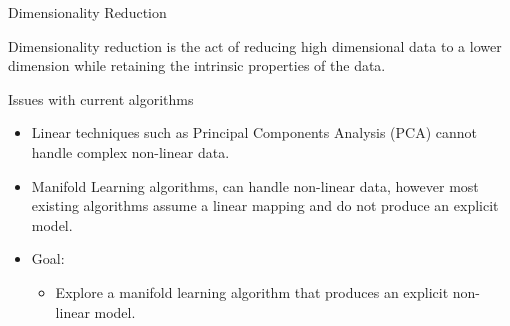 \documentclass{beamer}
\begin{document}

\begin{frame}{Dimensionality Reduction}
\begin{block}{}
    Dimensionality reduction is the act of reducing high dimensional data to a lower dimension while retaining the intrinsic properties of the data. 
\end{block}
\pause
\begin{block}{Issues with current algorithms}
    \begin{itemize}[<+->]
    \item  Linear techniques such as Principal Components Analysis (PCA) cannot handle complex non-linear data. 
    \item Manifold Learning algorithms, can handle non-linear data, however most existing algorithms assume a linear mapping and do not produce an explicit model.
    \item Goal:
    \begin{itemize}
        \item Explore a manifold learning algorithm that produces an explicit non-linear model.  
    \end{itemize}
    \end{itemize}
\end{block}
\end{frame}
\end{document}
